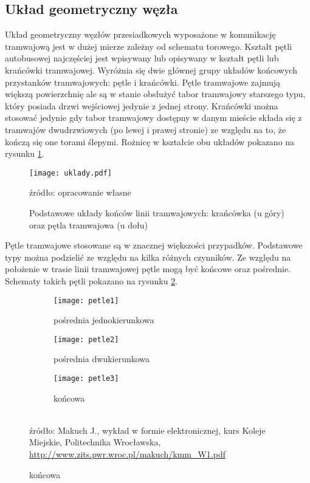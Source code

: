 \documentclass[twoside,12pt]{article}
\begin{document}
	\subsection{Układ geometryczny węzła}
	
	Układ geometryczny węzłów przesiadkowych wyposażone w komunikację tramwajową jest w dużej mierze zależny od schematu torowego. Kształt pętli autobusowej najczęściej jest wpisywany lub opisywany w kształt pętli lub krańcówki tramwajowej. Wyróżnia się dwie głównej grupy układów końcowych przystanków tramwajowych: pętle i krańcówki. Pętle tramwajowe zajmują większą powierzchnię ale są w stanie obsłużyć tabor tramwajowy starszego typu, który posiada drzwi wejściowej jedynie z jednej strony. Krańcówki można stosować jedynie gdy tabor tramwajowy dostępny w danym mieście składa się z tramwajów dwudrzwiowych (po lewej i prawej stronie) ze względu na to, że kończą się one torami ślepymi. Rożnicę w kształcie obu układów pokazano na rysunku \ref{uklady}.
	
	\begin{figure}[H]
		\centering
		\caption{Podstawowe układy końców linii tramwajowych: krańcówka (u góry) oraz pętla tramwajowa (u dołu)}
		\texttt{[image: uklady.pdf]}\\
		\label{uklady}
		
		\footnotesize{źródło: opracowanie własne}
	\end{figure}
	
	Pętle tramwajowe stosowane są w znacznej większości przypadków. Podstawowe typy można podzielić ze względu na kilka różnych czynników. Ze względu na położenie w trasie linii tramwajowej pętle mogą być końcowe oraz pośrednie. Schematy takich pętli pokazano na rysunku \ref{petle1}.
	
	\begin{figure}[H]
	\centering
	\caption{Podział pętli tramwajowych ze względu na położenia w trasie}
	\begin{subfigure}{.33\textwidth}
	  \centering
	  \caption{pośrednia jednokierunkowa}
	  \texttt{[image: petle1]}
	\end{subfigure}%
	\begin{subfigure}{.33\textwidth}
	  \centering
	  \caption{pośrednia dwukierunkowa}
	  \texttt{[image: petle2]}
	\end{subfigure}%
	\begin{subfigure}{.33\textwidth}
	  \centering
	  \caption{końcowa}
	  \texttt{[image: petle3]}
	\end{subfigure}
	\label{petle1}\\
	\footnotesize{źródło: Makuch J., wykład w formie elektronicznej, kurs Koleje Miejskie, Politechnika Wrocławska, \url{http://www.zits.pwr.wroc.pl/makuch/kmm_W1.pdf} \cite{makuch}}
	\end{figure}
\end{document}
